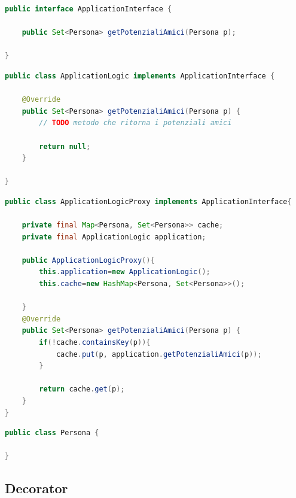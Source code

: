 \documentclass{article}
\begin{document}
\begin{lstlisting}[language=Java]
public interface ApplicationInterface {
	
	public Set<Persona> getPotenzialiAmici(Persona p);

}
\end{lstlisting}

\begin{lstlisting}[language=Java]
public class ApplicationLogic implements ApplicationInterface {

	@Override
	public Set<Persona> getPotenzialiAmici(Persona p) {
		// TODO metodo che ritorna i potenziali amici
		
		return null;
	}

}
\end{lstlisting}

\begin{lstlisting}[language=Java]
public class ApplicationLogicProxy implements ApplicationInterface{
	
	private final Map<Persona, Set<Persona>> cache;
	private final ApplicationLogic application;
	
	public ApplicationLogicProxy(){
		this.application=new ApplicationLogic();
		this.cache=new HashMap<Persona, Set<Persona>>();
		
	}
	@Override
	public Set<Persona> getPotenzialiAmici(Persona p) {
		if(!cache.containsKey(p)){
			cache.put(p, application.getPotenzialiAmici(p));
		}
		
		return cache.get(p);
	}
}
\end{lstlisting}

\begin{lstlisting}[language=Java]
public class Persona {
    
}
\end{lstlisting}

\subsection{Decorator}
\end{document}
